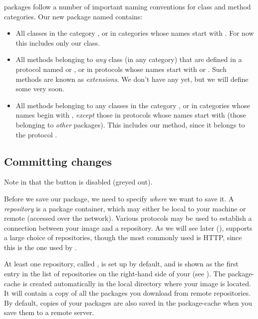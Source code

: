 \documentclass[a4paper,10pt,twoside]{book}
\begin{document}
\MC packages follow a number of important naming conventions for class and method categories.
Our new package named  contains:

\begin{itemize}

\item All classes in the category , or in categories whose names start with . For now this includes only our  class. 

\item All methods belonging to \emph{any} class (in any category) that are defined in a protocol named  or , or in protocols whose names start with  or . Such methods are known as \emph{extensions}. We don't have any yet, but we will define some very soon.

\item All methods belonging to any classes in the category , or in categories whose names begin with , \emph{except} those in protocols whose names start with \prot{*} (\ie those belonging to \emph{other} packages). This includes our  method, since it belongs to the protocol .

\end{itemize}

\subsection{Committing changes}

Note in  that the  button is disabled (greyed out).

Before we save our  package, we need to specify \emph{where} we want to save it. A \emph{repository} is a package container, which may either be local to your machine or remote (accessed over the network). 
Various protocols may be used to establish a connection between your \pharo image and a repository. As we will see later (), \MC supports a large choice of repositories, though the most commonly used is HTTP, since this is the one used by \sqsrc.

At least one repository, called , is set up by default, and is shown as the first entry in the list of repositories on the right-hand side of your \MCB (see ).
The package-cache is created automatically in the local directory where your \pharo image is located. It will contain a copy of all the packages you download from remote repositories. 
By default, copies of your packages are also saved in the package-cache when you save them to a remote server.
\end{document}
